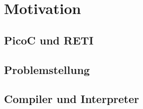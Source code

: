 \chapter{Motivation}
\section{PicoC und RETI}
\section{Problemstellung}
\section{Compiler und Interpreter}
